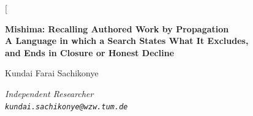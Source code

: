 \documentclass[11pt,twocolumn,a4paper]{article}
\theoremstyle{definition}
\theoremstyle{remark}
\begin{document}
\twocolumn[
\begin{@twocolumnfalse}
\begin{center}

{\LARGE\bfseries Mishima: Recalling Authored Work by Propagation\\[4pt]
A Language in which a Search States What It Excludes,\\
and Ends in Closure or Honest Decline}

\vspace{12pt}

{\large Kundai Farai Sachikonye}

\vspace{6pt}

{\small\itshape Independent Researcher \\[0.3em]
\texttt{kundai.sachikonye@wzw.tum.de}}

\vspace{6pt}{\small August 2026}

\vspace{16pt}


\end{center}
\end{@twocolumnfalse}
\end{document}
